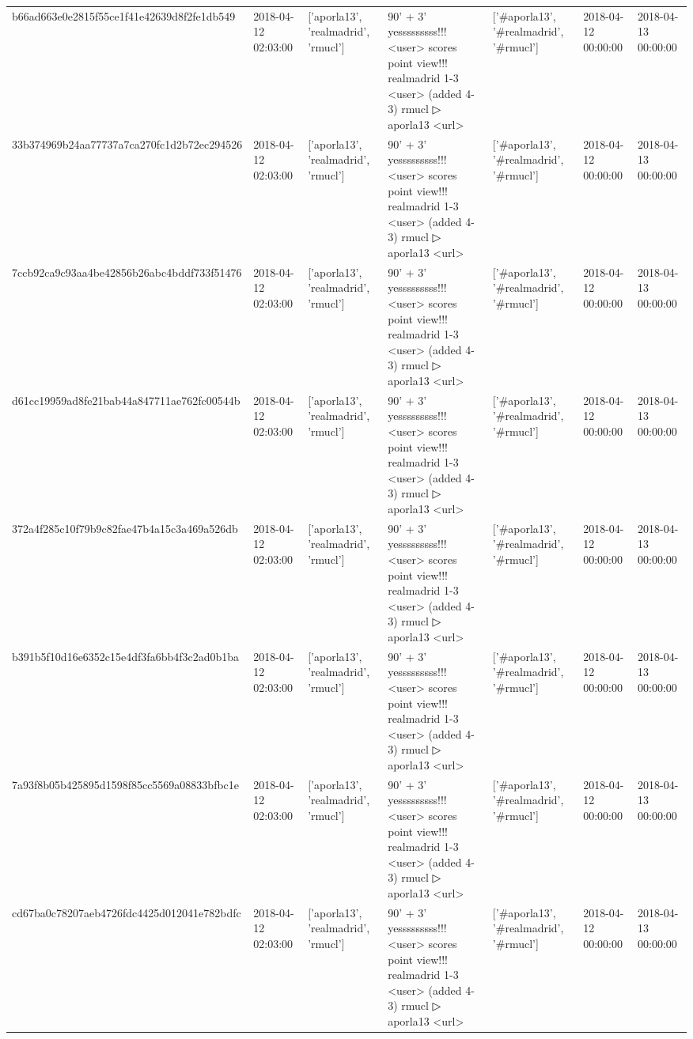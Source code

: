\begin{tabular}{lllllll}
b66ad663e0e2815f55ce1f41e42639d8f2fe1db549 & 2018-04-12 02:03:00 & ['aporla13', 'realmadrid', 'rmucl'] & 90' + 3' yesssssssss!!! <user> scores point view!!! realmadrid 1-3 <user> (added 4-3) rmucl ▷ aporla13 <url> & ['#aporla13', '#realmadrid', '#rmucl'] & 2018-04-12 00:00:00 & 2018-04-13 00:00:00 \\
33b374969b24aa77737a7ca270fc1d2b72ec294526 & 2018-04-12 02:03:00 & ['aporla13', 'realmadrid', 'rmucl'] & 90' + 3' yesssssssss!!! <user> scores point view!!! realmadrid 1-3 <user> (added 4-3) rmucl ▷ aporla13 <url> & ['#aporla13', '#realmadrid', '#rmucl'] & 2018-04-12 00:00:00 & 2018-04-13 00:00:00 \\
7ccb92ca9c93aa4be42856b26abc4bddf733f51476 & 2018-04-12 02:03:00 & ['aporla13', 'realmadrid', 'rmucl'] & 90' + 3' yesssssssss!!! <user> scores point view!!! realmadrid 1-3 <user> (added 4-3) rmucl ▷ aporla13 <url> & ['#aporla13', '#realmadrid', '#rmucl'] & 2018-04-12 00:00:00 & 2018-04-13 00:00:00 \\
d61cc19959ad8fe21bab44a847711ae762fc00544b & 2018-04-12 02:03:00 & ['aporla13', 'realmadrid', 'rmucl'] & 90' + 3' yesssssssss!!! <user> scores point view!!! realmadrid 1-3 <user> (added 4-3) rmucl ▷ aporla13 <url> & ['#aporla13', '#realmadrid', '#rmucl'] & 2018-04-12 00:00:00 & 2018-04-13 00:00:00 \\
372a4f285c10f79b9c82fae47b4a15c3a469a526db & 2018-04-12 02:03:00 & ['aporla13', 'realmadrid', 'rmucl'] & 90' + 3' yesssssssss!!! <user> scores point view!!! realmadrid 1-3 <user> (added 4-3) rmucl ▷ aporla13 <url> & ['#aporla13', '#realmadrid', '#rmucl'] & 2018-04-12 00:00:00 & 2018-04-13 00:00:00 \\
b391b5f10d16e6352c15e4df3fa6bb4f3c2ad0b1ba & 2018-04-12 02:03:00 & ['aporla13', 'realmadrid', 'rmucl'] & 90' + 3' yesssssssss!!! <user> scores point view!!! realmadrid 1-3 <user> (added 4-3) rmucl ▷ aporla13 <url> & ['#aporla13', '#realmadrid', '#rmucl'] & 2018-04-12 00:00:00 & 2018-04-13 00:00:00 \\
7a93f8b05b425895d1598f85cc5569a08833bfbc1e & 2018-04-12 02:03:00 & ['aporla13', 'realmadrid', 'rmucl'] & 90' + 3' yesssssssss!!! <user> scores point view!!! realmadrid 1-3 <user> (added 4-3) rmucl ▷ aporla13 <url> & ['#aporla13', '#realmadrid', '#rmucl'] & 2018-04-12 00:00:00 & 2018-04-13 00:00:00 \\
cd67ba0c78207aeb4726fdc4425d012041e782bdfc & 2018-04-12 02:03:00 & ['aporla13', 'realmadrid', 'rmucl'] & 90' + 3' yesssssssss!!! <user> scores point view!!! realmadrid 1-3 <user> (added 4-3) rmucl ▷ aporla13 <url> & ['#aporla13', '#realmadrid', '#rmucl'] & 2018-04-12 00:00:00 & 2018-04-13 00:00:00 \\

\end{tabular}
